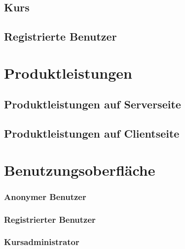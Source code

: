 \documentclass[a4paper]{scrreprt}
\begin{document}
	    
	    
	    	
	\section{Kurs}
	   
	    
	    
    
    
    		
    \section{Registrierte Benutzer}
	  
	    
	    
	   
	    
    
\chapter{Produktleistungen}
	

	\section{Produktleistungen auf Serverseite}
		
	\section{Produktleistungen auf Clientseite}
	
		
		
 
\chapter{Benutzungsoberfläche}
    
    
    \subsection{Anonymer Benutzer}
       	
       	
       	
    \subsection{Registrierter Benutzer}
       
       	
       	    
    \subsection{Kursadministrator}
        
\end{document}
